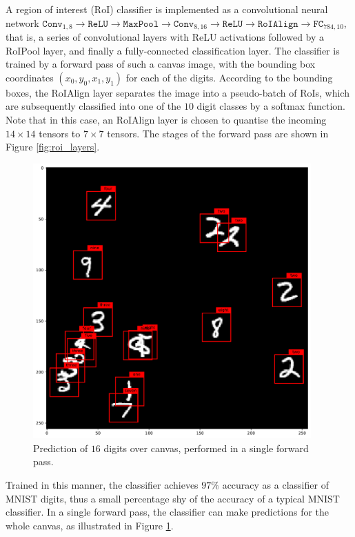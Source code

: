 A region of interest (RoI) classifier is implemented as a convolutional neural network $\texttt{Conv}_{1, 8} \rightarrow \texttt{ReLU} \rightarrow \texttt{MaxPool} \rightarrow \texttt{Conv}_{8, 16} \rightarrow \texttt{ReLU} \rightarrow \texttt{RoIAlign} \rightarrow \texttt{FC}_{784, 10}$, that is, a series of convolutional layers with ReLU activations followed by a RoIPool layer, and finally a fully-connected classification layer. The classifier is trained by a forward pass of such a canvas image, with the bounding box coordinates $(x_0, y_0, x_1, y_1)$ for each of the digits. According to the bounding boxes, the RoIAlign layer separates the image into a pseudo-batch of RoIs, which are subsequently classified into one of the $10$ digit classes by a softmax function. Note that in this case, an RoIAlign layer is chosen to quantise the incoming $14\times14$ tensors to $7\times7$ tensors. The stages of the forward pass are shown in Figure \ref{fig:roi_layers}.

\begin{figure}[h]
\centering
\includegraphics[width=0.95\textwidth]{img/roi_prediction.pdf}
\caption{Prediction of $16$ digits over canvas, performed in a single forward pass.}
\label{fig:roi_prediction}
\end{figure}

Trained in this manner, the classifier achieves $97\%$ accuracy as a classifier of MNIST digits, thus a small percentage shy of the accuracy of a typical MNIST classifier. In a single forward pass, the classifier can make predictions for the whole canvas, as illustrated in Figure \ref{fig:roi_prediction}. 

